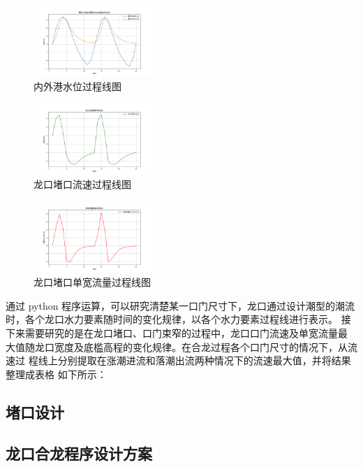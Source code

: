 \documentclass[UTF8, a4paper, 12pt]{ctexart} %
\begin{document}
\begin{figure}[h]
    \centering
    \includegraphics[width=0.4\textwidth]{figure_1.png}
    \caption{内外港水位过程线图}
    \label{fig:hydraulic_process_line}
\end{figure}

\begin{figure}[h]
    \centering
    \includegraphics[width=0.4\textwidth]{figure_2.png}
    \caption{龙口堵口流速过程线图}
    \label{fig:hydraulic_process_line}
\end{figure}

\begin{figure}[h]
    \centering
    \includegraphics[width=0.4\textwidth]{figure_3.png}
    \caption{ 龙口堵口单宽流量过程线图}
    \label{fig:hydraulic_process_line}
\end{figure}
\newpage
通过 python 程序运算，可以研究清楚某一口门尺寸下，龙口通过设计潮型的潮流
时，各个龙口水力要素随时间的变化规律，以各个水力要素过程线进行表示。
接下来需要研究的是在龙口堵口、口门束窄的过程中，龙口口门流速及单宽流量最
大值随龙口宽度及底槛高程的变化规律。在合龙过程各个口门尺寸的情况下，从流速过
程线上分别提取在涨潮进流和落潮出流两种情况下的流速最大值，并将结果整理成表格
如下所示：

\newpage
\subsection{堵口设计}
\subsection{龙口合龙程序设计方案}
\end{document}
